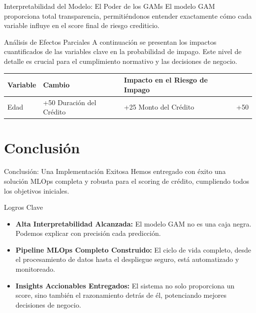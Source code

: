\documentclass{beamer}
\begin{document}
\begin{frame}{Interpretabilidad del Modelo: El Poder de los GAMs}
  El modelo GAM proporciona total transparencia, permitiéndonos entender exactamente cómo cada variable influye en el score final de riesgo crediticio.
  
  \begin{block}{Análisis de Efectos Parciales}
    A continuación se presentan los impactos cuantificados de las variables clave en la probabilidad de impago. Este nivel de detalle es crucial para el cumplimiento normativo y las decisiones de negocio.
  \end{block}
  
  \begin{tabular}{l l l}
    \toprule
    \textbf{Variable} & \textbf{Cambio} & \textbf{Impacto en el Riesgo de Impago} \\
    \midrule
    Edad & +50%
    Duración del Crédito & +25%
    Monto del Crédito & +50%
    \bottomrule
  \end{tabular}
\end{frame}


\section{Conclusión}

\begin{frame}{Conclusión: Una Implementación Exitosa}
  Hemos entregado con éxito una solución MLOps completa y robusta para el scoring de crédito, cumpliendo todos los objetivos iniciales.
  \begin{alertblock}{Logros Clave}
    \begin{itemize}
      \item[\faCheckCircle] \textbf{Alta Interpretabilidad Alcanzada:} El modelo GAM no es una caja negra. Podemos explicar con precisión cada predicción.
      \item[\faCheckCircle] \textbf{Pipeline MLOps Completo Construido:} El ciclo de vida completo, desde el procesamiento de datos hasta el despliegue seguro, está automatizado y monitoreado.
      \item[\faCheckCircle] \textbf{Insights Accionables Entregados:} El sistema no solo proporciona un score, sino también el razonamiento detrás de él, potenciando mejores decisiones de negocio.
    \end{itemize}
  \end{alertblock}
\end{frame}
\end{document}
